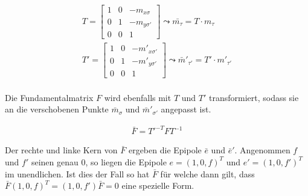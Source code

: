 
\begin{gather}
	T = \begin{bmatrix}
	1&0&-m_{x\sigma}\\
	0&1&-m_{y\sigma'}\\
	0&0&1
	\end{bmatrix} \leadsto \bar{m_\tau} = T\cdot m_\tau\\
	T' = \begin{bmatrix}
	1&0&-m'_{x\sigma'}\\
	0&1&-m'_{y\sigma'}\\
	0&0&1
	\end{bmatrix} \leadsto 	\bar{m}'_{\tau'} = T' \cdot m'_{\tau'}
\end{gather} \\

Die Fundamentalmatrix $F$ wird ebenfalls mit $T$ und $T'$ transformiert, sodass sie an die verschobenen Punkte $\bar{m}_{\sigma}$ und $\bar{m}'_{\sigma'}$ angepasst ist.
%

\begin{gather}
	\bar{F}= T'^{-T}FT^{-1}
\end{gather}

Der rechte und linke Kern von $\bar{F}$ ergeben die Epipole $\bar{e}$ und $\bar{e}'$. Angenommen $f$ und $f'$ seinen genau 0, so liegen die Epipole $e = (1,0,f)^T$ und $e' = (1,0,f')^T$ im unendlichen. Ist dies der Fall so hat $\bar{F}$ für welche dann gilt, dass $\bar{F}(1,0,f)^T = (1,0,f')\bar{F}=0$ eine spezielle Form\cite{HZ}.




